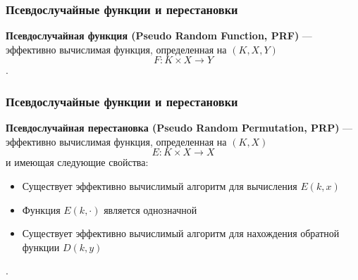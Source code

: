 \documentclass{beamer}
\newcommand{\define}[2]{{\bf #1} --- #2.\vspace{1em}}
\begin{document}
\begin{frame}
  \frametitle{Псевдослучайные функции и перестановки}

  \define{Псевдослучайная функция (Pseudo Random Function, PRF)} {
    эффективно вычислимая функция, определенная на $(K,X,Y)$ \newline
    \[F: K \times X \rightarrow Y\]}

\end{frame}


\begin{frame}
  \frametitle{Псевдослучайные функции и перестановки}

  \define{Псевдослучайная перестановка (Pseudo Random Permutation, PRP)} {
    эффективно вычислимая функция, определенная на $(K,X)$ \newline
    \[E: K \times X \rightarrow X\]
    и имеющая следующие свойства:

    \begin{itemize}
      \item{Существует эффективно вычислимый алгоритм для вычисления $E(k,x)$}
      \item{Функция $E(k,\cdot)$ является однозначной}
      \item{Существует эффективно вычислимый алгоритм для нахождения обратной функции $D(k,y)$}
    \end{itemize}
  }


\end{frame}
\end{document}
